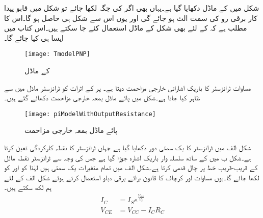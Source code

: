 شکل  میں  کے  ماڈل دکھایا گیا ہے۔یہاں بھی اگر  کی جگہ  لکھا جائے تو شکل میں قابو پیدا کار برقی رو کی سمت الٹ ہو جائے گی اور یوں اس سے شکل  ہی حاصل ہو گا۔اس کا مطلب ہے کہ  کے لئے بھی شکل  کے ماڈل استعمال کئے جا سکتے ہیں۔اس کتاب میں ایسا ہی کیا جائے گا۔
\begin{figure}
\centering
\texttt{[image: TmodelPNP]}
\caption{ کے  ماڈل}
\label{شکل_ٹی_ماڈل_الف}
\end{figure}
مساوات   ٹرانزسٹر کا باریک اشاراتی خارجی مزاحمت  دیتا ہے۔  پر   کے اثرات کو ٹرانزسٹر ماڈل میں  سے ظاہر کیا جاتا ہے۔شکل   میں پائے ماڈل بمعہ خارجی مزاحمت  دکھائے گئے ہیں۔
\begin{figure}
\centering
\texttt{[image: piModelWithOutputResistance]}
\caption{پائے ماڈل بمعہ خارجی مزاحمت }
\label{شکل_پائے_ماڈل_بمع_خارجی_مزاحمت}
\end{figure}
شکل  الف میں ٹرانزسٹر کا یک سمتی دور دکھایا گیا ہے جہاں  ٹرانزسٹر کا نقطہ کارکردگی تعین کرتا ہے۔شکل  ب میں  کے ساتھ سلسلہ وار باریک اشارہ  جوڑا گیا ہے جس کی وجہ سے ٹرانزسٹر نقطہ مائل کے قریب-قریب  خط پر چال قدمی کرتا ہے۔شکل  الف   میں تمام متغیرات یک سمتی ہیں لہٰذا  کو  اور  کو  لکھا جائے گا۔یوں مساوات  اور کرچاف کا قانون برائے برقی دباو استعمال کرتے ہوئے شکل  الف   کے لئے ہم لکھ سکتے ہیں۔
\begin{align}
I_C&=I_S e^{\frac{V_{BE}}{V_T}} \label{مساوات_ٹرانزسٹر_اشارہ_عدم_موجود_لہذا_یکسمتی_رو}\\
V_{CE}&=V_{CC}-I_C R_C \label{مساوات_ٹرانزسٹر_اشارہ_عدم_موجود_لہذا_یکسمتی_دباو}
\end{align}

